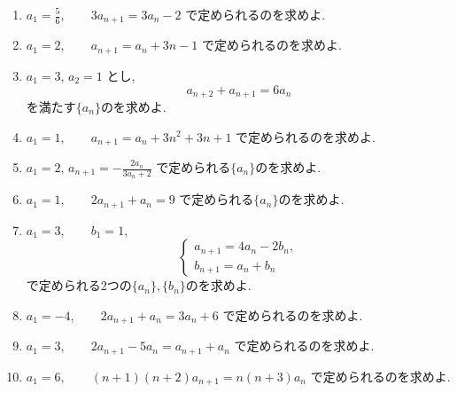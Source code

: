 \begin{enumerate}[label=\textbf{問\arabic*.},leftmargin=3.8em,format=\bookitemlink{practice-basic}{problem}{answer}]
          \item $\displaystyle a_1=\frac56,\qquad 3a_{n+1}=3a_n-2$
                で定められるのを求めよ.
          \item $\displaystyle a_1=2,\qquad a_{n+1}=a_n+3n-1$
                で定められるのを求めよ.
          \item $\displaystyle a_1=3,\,a_2=1$ とし,
                \[
                  a_{n+2}+a_{n+1}=6a_n
                \]
                を満たす$\{a_n\}$のを求めよ.
          \item $\displaystyle a_1=1,\qquad a_{n+1}=a_n+3n^2+3n+1$
                で定められるのを求めよ.
          \item $\displaystyle a_1=2,\,a_{n+1}=-\frac{2a_n}{3a_n+2}$
                で定められる$\{a_n\}$のを求めよ.
          \item $\displaystyle a_1=1,\qquad 2a_{n+1}+a_n=9$
                で定められる$\{a_n\}$のを求めよ.
          \item $\displaystyle a_1=3,\qquad b_1=1,$
                            \[
                              \begin{cases}
                                a_{n+1}=4a_n-2b_n,\\
                                b_{n+1}=a_n+b_n
                              \end{cases}
                            \]
                                で定められる2つの$\{a_n\},\{b_n\}$のを求めよ.
          \item $\displaystyle a_1=-4,\qquad 2a_{n+1}+a_n=3a_n+6$
                で定められるのを求めよ.
          \item $\displaystyle a_1=3,\qquad 2a_{n+1}-5a_n=a_{n+1}+a_n$
                で定められるのを求めよ.
          \item $\displaystyle a_1=6,\qquad
                 (n+1)(n+2)a_{n+1}=n(n+3)a_n$
                で定められるのを求めよ.

\end{enumerate}
